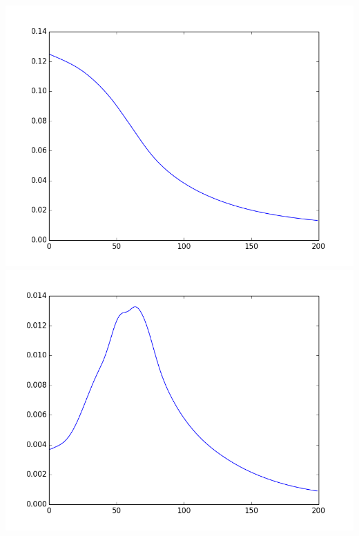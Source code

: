 \documentclass[a4paper,norsk]{article}
\begin{document}
\includegraphics[trim = 0mm 0mm 0mm 0mm, clip, scale=0.4]{kinetic_e_best.png} 
\includegraphics[trim = 0mm 0mm 0mm 0mm, clip, scale=0.4]{dKdt_best.png} 
\end{document}
